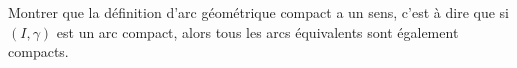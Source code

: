 \begin{exercice}\label{exoGeomAnal-0001}

	Montrer que la définition d'arc géométrique compact a un sens, c'est à dire que si $(I,\gamma)$ est un arc compact, alors tous les arcs équivalents sont également compacts.

\end{exercice}
